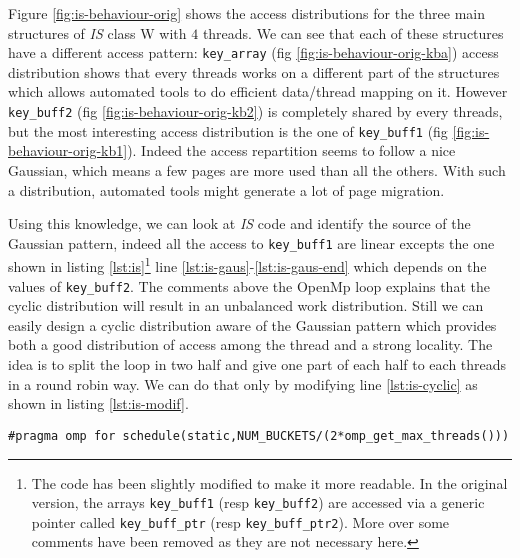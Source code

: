 Figure \ref{fig:is-behaviour-orig} shows the access distributions for the
three main structures of \emph{IS} class W with $4$ threads. We can see that
each of these structures have a different access pattern: \texttt{key\_array}
(fig \ref{fig:is-behaviour-orig-kba}) access distribution shows that every
threads works on a different part of the structures which allows automated
tools to do efficient data/thread mapping on it. However \texttt{key\_buff2}
(fig \ref{fig:is-behaviour-orig-kb2}) is completely shared by every threads,
but the most interesting access distribution is the one of \texttt{key\_buff1}
(fig \ref{fig:is-behaviour-orig-kb1}). Indeed the access repartition seems to
follow a nice Gaussian, which means a few pages are more used than all the
others. With such a distribution, automated tools might generate a lot of page
migration.



Using this knowledge, we can look at \emph{IS} code and identify the source of the
Gaussian pattern, indeed all the access to \texttt{key\_buff1} are linear
excepts the one shown in listing \ref{lst:is}\footnote{
    The code has been slightly modified to make it more readable. In the
    original version, the arrays \texttt{key\_buff1} (resp \texttt{key\_buff2})
    are accessed via a generic pointer called \texttt{key\_buff\_ptr} (resp
    \texttt{key\_buff\_ptr2}). More over some comments have been removed as
    they are not necessary here.
}  line \ref{lst:is-gaus}-\ref{lst:is-gaus-end} which depends on the values of
\texttt{key\_buff2}. The comments above the OpenMp loop explains that the
cyclic distribution will result in an unbalanced work distribution. Still we can easily design a cyclic
distribution aware of the Gaussian pattern which provides both a good
distribution of access among the thread and a strong locality. The idea is to
split the loop in two half and give one part of each half to each threads in a
round robin way. We can do that only by modifying line \ref{lst:is-cyclic} as
shown in listing \ref{lst:is-modif}.
\begin{lstlisting}[caption=Optimization for \emph{IS}., label=lst:is-modif]
#pragma omp for schedule(static,NUM_BUCKETS/(2*omp_get_max_threads()))
\end{lstlisting}

